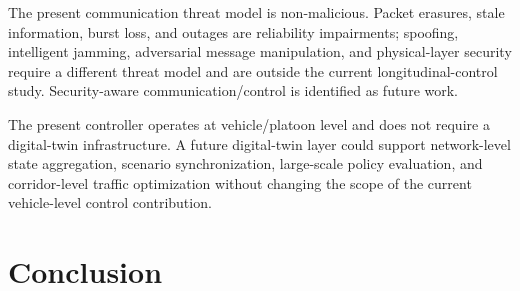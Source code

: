 \documentclass{ieeeaccess}
\begin{document}
The present communication threat model is non-malicious. Packet erasures, stale information, burst loss, and outages are reliability impairments; spoofing, intelligent jamming, adversarial message manipulation, and physical-layer security require a different threat model and are outside the current longitudinal-control study. Security-aware communication/control is identified as future work.

The present controller operates at vehicle/platoon level and does not require a digital-twin infrastructure. A future digital-twin layer could support network-level state aggregation, scenario synchronization, large-scale policy evaluation, and corridor-level traffic optimization without changing the scope of the current vehicle-level control contribution.

\section{Conclusion}
\label{sec:Conclusion}
\end{document}
